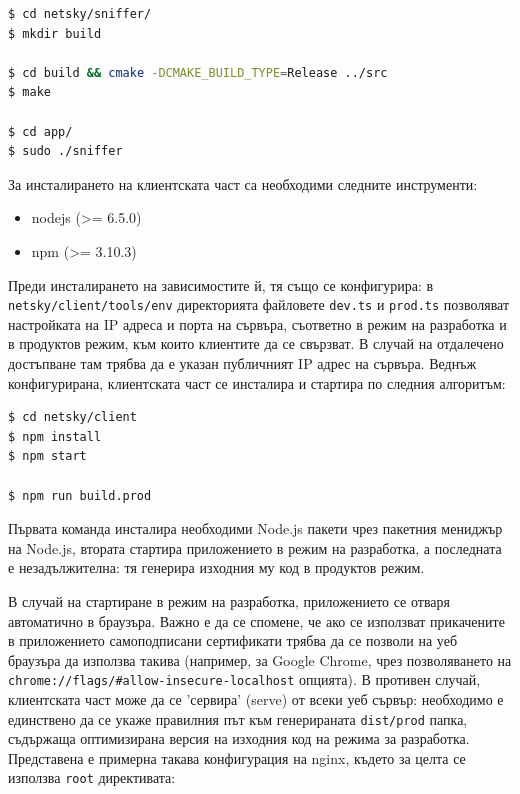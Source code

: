 \documentclass[12pt,a4paper,oneside]{book}
\begin{document}
\begin{lstlisting}[language=bash,caption=Компилиране и пускане на сървърната част на
  приложението]
$ cd netsky/sniffer/
$ mkdir build

$ cd build && cmake -DCMAKE_BUILD_TYPE=Release ../src
$ make

$ cd app/
$ sudo ./sniffer
\end{lstlisting}

За инсталирането на клиентската част са необходими следните инструменти:

\begin{itemize}
  \item
    nodejs (>= 6.5.0)
  \item
    npm (>= 3.10.3)
\end{itemize}

Преди инсталирането на зависимостите й, тя също се конфигурира:
в \texttt{netsky/client/tools/env} директорията файловете \texttt{dev.ts} и
\texttt{prod.ts} позволяват настройката на IP адреса и порта на сървъра,
съответно в режим на разработка и в продуктов режим, към които клиентите да се свързват. В
случай на отдалечено достъпване там трябва да е указан публичният IP адрес на
сървъра. Веднъж конфигурирана, клиентската част се инсталира и стартира по
следния алгоритъм:

\begin{lstlisting}[language=bash,caption=Инсталиране и стартиране на клиентската част]
$ cd netsky/client
$ npm install
$ npm start

$ npm run build.prod
\end{lstlisting}

Първата команда инсталира необходими Node.js пакети чрез пакетния мениджър на
Node.js, втората стартира
приложението в режим на разработка, а последната е незадължителна: тя генерира
изходния му код в продуктов режим.

В случай на стартиране в режим на разработка, приложението се отваря автоматично в
браузъра. Важно е да се спомене, че ако се използват прикачените в приложението самоподписани
сертификати трябва да се позволи на уеб браузъра да използва такива (например, за Google Chrome, чрез позволяването на
\texttt{chrome://flags/#allow-insecure-localhost} опцията). В противен случай, клиентската част може да се 'сервира' (serve)
от всеки уеб сървър: необходимо е единствено да се укаже правилния път към
генерираната \texttt{dist/prod} папка, съдържаща оптимизирана версия
на изходния код на режима за разработка.
Представена е примерна такава конфигурация на nginx, където за целта се използва
\texttt{root} директивата:
\end{document}
